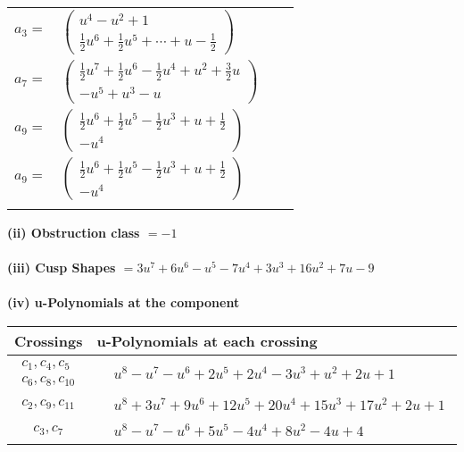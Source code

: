 \documentclass[1p]{elsarticle_modified}
\theoremstyle{definition}
\begin{document}
\begin{tabular}{m{7pt} m{180pt} m{7pt} m{180pt} }
\flushright $a_{3}=$&$\begin{pmatrix}u^4- u^2+1\\\frac{1}{2} u^6+\frac{1}{2} u^5+\cdots+u-\frac{1}{2}\end{pmatrix}$ \\
\flushright $a_{7}=$&$\begin{pmatrix}\frac{1}{2} u^7+\frac{1}{2} u^6-\frac{1}{2} u^4+u^2+\frac{3}{2} u\\- u^5+u^3- u\end{pmatrix}$ \\
\flushright $a_{9}=$&$\begin{pmatrix}\frac{1}{2} u^6+\frac{1}{2} u^5-\frac{1}{2} u^3+u+\frac{1}{2}\\- u^4\end{pmatrix}$\\ \flushright $a_{9}=$&$\begin{pmatrix}\frac{1}{2} u^6+\frac{1}{2} u^5-\frac{1}{2} u^3+u+\frac{1}{2}\\- u^4\end{pmatrix}$\\&\end{tabular}
\flushleft \textbf{(ii) Obstruction class $= -1$}\\~\\
\flushleft \textbf{(iii) Cusp Shapes $= 3 u^7+6 u^6- u^5-7 u^4+3 u^3+16 u^2+7 u-9$}\\~\\
\newpage\renewcommand{\arraystretch}{1}
\flushleft \textbf{(iv) u-Polynomials at the component}\newline \\
\begin{tabular}{m{50pt}|m{274pt}}
Crossings & \hspace{64pt}u-Polynomials at each crossing \\
\hline $$\begin{aligned}c_{1},c_{4},c_{5}\\c_{6},c_{8},c_{10}\end{aligned}$$&$\begin{aligned}
&u^8- u^7- u^6+2 u^5+2 u^4-3 u^3+u^2+2 u+1
\end{aligned}$\\
\hline $$\begin{aligned}c_{2},c_{9},c_{11}\end{aligned}$$&$\begin{aligned}
&u^8+3 u^7+9 u^6+12 u^5+20 u^4+15 u^3+17 u^2+2 u+1
\end{aligned}$\\
\hline $$\begin{aligned}c_{3},c_{7}\end{aligned}$$&$\begin{aligned}
&u^8- u^7- u^6+5 u^5-4 u^4+8 u^2-4 u+4
\end{aligned}$\\
\hline
\end{tabular}\\~\\
\end{document}

